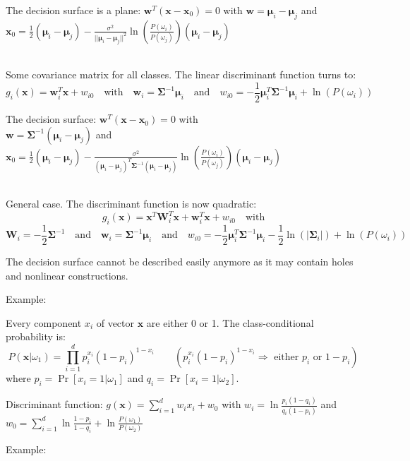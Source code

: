   The decision surface is a plane: $\mathbf{w}^T(\mathbf{x}-\mathbf{x}_0) = 0$ with $\mathbf{w} = \boldsymbol{\mu}_i - \boldsymbol{\mu}_j$ and 
  $\mathbf{x}_0 = \frac{1}{2}(\boldsymbol{\mu}_i-\boldsymbol{\mu}_j) - \frac{\sigma^2}{||\boldsymbol{\mu}_i-\boldsymbol{\mu}_j||^2} \ln\left(\frac{P(\omega_i)}{P(\omega_j)}\right) (\boldsymbol{\mu}_i-\boldsymbol{\mu}_j)$
  
  
  \\
  Some covariance matrix for all classes.
  The linear discriminant function turns to: 
  $$g_i(\mathbf{x}) = \mathbf{w}_i^T \mathbf{x} + w_{i0} \quad \text{with} \quad
  \mathbf{w}_i = \boldsymbol{\Sigma}^{-1}\boldsymbol{\mu}_i \quad \text{and} \quad
  w_{i0} = -\frac{1}{2} \boldsymbol{\mu}_i^T \boldsymbol{\Sigma}^{-1}\boldsymbol{\mu}_i + \ln(P(\omega_i))$$
  
  The decision surface: $\mathbf{w}^T(\mathbf{x}-\mathbf{x}_0) = 0$ \quad with \\
  $\mathbf{w} = \boldsymbol{\Sigma}^{-1} (\boldsymbol{\mu}_i - \boldsymbol{\mu}_j)$ \quad and \quad 
  $\mathbf{x}_0 = \frac{1}{2}(\boldsymbol{\mu}_i-\boldsymbol{\mu}_j) - \frac{\sigma^2}{(\boldsymbol{\mu}_i-\boldsymbol{\mu}_j)^T \boldsymbol{\Sigma}^{-1} (\boldsymbol{\mu}_i-\boldsymbol{\mu}_j)} \ln\left(\frac{P(\omega_i)}{P(\omega_j)}\right) (\boldsymbol{\mu}_i-\boldsymbol{\mu}_j)$
  
  
  \\
  General case.
  The discriminant function is now quadratic: 
  $$g_i(\mathbf{x}) = \mathbf{x}^T \mathbf{W}_i^T \mathbf{x} + \mathbf{w}_i^T \mathbf{x} +w_{i0} \quad\text{with}$$
  $$\mathbf{W}_i = -\frac{1}{2} \boldsymbol{\Sigma}^{-1} \quad\text{and}\quad
  \mathbf{w}_i = \boldsymbol{\Sigma}^{-1}\boldsymbol{\mu}_i \quad\text{and}\quad
  w_{i0} = -\frac{1}{2} \boldsymbol{\mu}_i^T\boldsymbol{\Sigma}^{-1}\boldsymbol{\mu}_i - \frac{1}{2}\ln(|\boldsymbol{\Sigma}_i|) + \ln(P(\omega_i))$$
  
  The decision surface cannot be described easily anymore as it may contain holes and nonlinear constructions.
  
  Example: 
  

  Every component $x_i$ of vector $\mathbf{x}$ are either 0 or 1. The class-conditional probability is:\\
  $$P(\mathbf{x}|\omega_1)=\prod\limits_{i=1}^d p_i^{x_i}(1-p_i)^{1-x_i} \qquad ( p_i^{x_i}(1-p_i)^{1-x_i} \Rightarrow\text{ either }p_i\text{ or }1-p_i)$$
  where $p_i = \operatorname{Pr}\left[x_i=1|\omega_1\right]$ and $q_i = \operatorname{Pr}\left[ x_i=1 | \omega_2 \right]$.
  
  
  Discriminant function: $g(\bm x) = \sum\limits_{i=1}^d w_i x_i + w_0$ with 
  $w_i = \ln \frac{p_i(1-q_i)}{q_i(1-p_i)}$ and 
  $w_0 = \sum\limits_{i=1}^d \ln \frac{1-p_i}{1-q_i} + \ln \frac{P(\omega_1)}{P(\omega_2)}$
  
  Example: 
